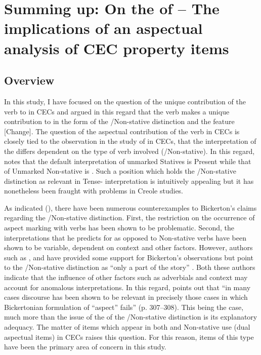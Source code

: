 \chapter[Summing up: On the \isi{categorial status} of \isi{dual aspectual forms}]{Summing up: On the  of  -- The implications of an aspectual analysis of CEC property items}
\label{sec:6}\label{ch:6}

\section{Overview}\label{sec:6.0}
In this study, I have focused on the question of the unique contribution of the verb to  in CECs and argued in this regard that the verb makes a unique contribution to  in the form of the \slash Non-stative distinction and the feature [Change]. The question of the aspectual contribution of the verb in CECs is closely tied to the observation in the study of  in CECs, that the interpretation of the  differs dependent on the type of verb involved (\slash Non-stative). In this regard, \citet{Bickerton1975} notes that the default interpretation of unmarked Statives is Present while that of Unmarked Non-stative is . Such a position which holds the \slash Non-stative distinction as relevant in Tense- interpretation is intuitively appealing but it has nonetheless been fraught with problems in Creole studies. 

As indicated (), there have been numerous counterexamples to Bickerton’s claims regarding the \slash Non-stative distinction. First, the restriction on the occurrence of  aspect marking with  verbs has been shown to be problematic. Second, the  interpretations that he predicts for  as opposed to Non-stative verbs have been shown to be variable, dependent on context and other factors. However, authors such as \citet{Winford1993}, and \citet{Gooden2008} have provided some support for Bickerton’s observations but point to the \slash Non-stative distinction as “only a part of the story” \citep[307]{Gooden2008}. Both these authors indicate that the influence of other factors such as adverbials and context may account for anomalous interpretations. In this regard, \citet{Gooden2008} points out that ``in many cases discourse has been shown to be relevant in precisely those cases in which Bickertonian formulation of ``aspect” fails” (p. 307--308). This being the case, much more than the issue of the  of the \slash Non-stative distinction is its explanatory adequacy. The matter of items which appear in both  and Non-stative use (dual aspectual items) in CECs raises this question. For this reason, items of this type have been the primary area of concern in this study. 

